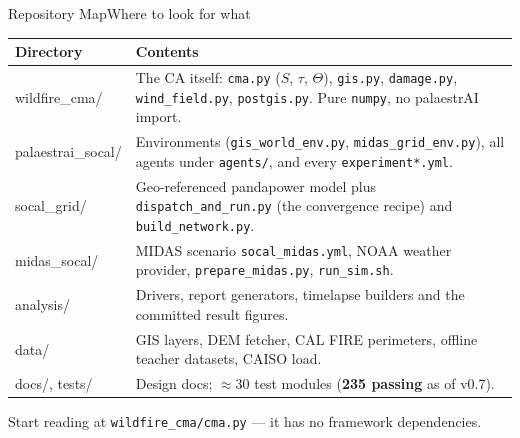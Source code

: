 \documentclass[aspectratio=169,9pt]{beamer}
\newcommand{\code}[1]{{\small\texttt{#1}}}
\begin{document}
\begin{frame}{Repository Map}{Where to look for what}
  \small
  \begin{tabular}{@{}>{\ttfamily}l p{}@{}}
    \toprule
    \textrm{\textbf{Directory}} & \textbf{Contents} \\
    \midrule
    wildfire\_cma/     & The CA itself: \code{cma.py} ($S$, $\tau$, $\Theta$),
                         \code{gis.py}, \code{damage.py},
                         \code{wind\_field.py}, \code{postgis.py}. Pure
                         \code{numpy}, no palaestrAI import. \\
    palaestrai\_socal/ & Environments (\code{gis\_world\_env.py},
                         \code{midas\_grid\_env.py}), all agents under
                         \code{agents/}, and every
                         \code{experiment*.yml}. \\
    socal\_grid/       & Geo-referenced pandapower model plus
                         \code{dispatch\_and\_run.py} (the convergence
                         recipe) and \code{build\_network.py}. \\
    midas\_socal/      & MIDAS scenario \code{socal\_midas.yml}, NOAA
                         weather provider, \code{prepare\_midas.py},
                         \code{run\_sim.sh}. \\
    analysis/          & Drivers, report generators, timelapse builders and
                         the committed result figures. \\
    data/              & GIS layers, DEM fetcher, CAL FIRE perimeters,
                         offline teacher datasets, CAISO load. \\
    docs/, tests/      & Design docs; $\approx$30 test modules
                         (\textbf{235 passing} as of v0.7). \\
    \bottomrule
  \end{tabular}
  \vskip5pt
  {\scriptsize\color{csladarkgray}Start reading at
   \texttt{wildfire\_cma/cma.py} --- it has no framework dependencies.}
\end{frame}
\end{document}
